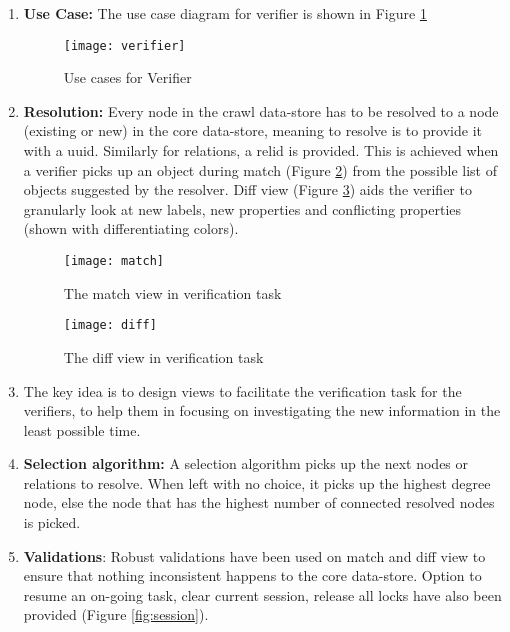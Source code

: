 \begin{enumerate}

\item \textbf{Use Case:} The use case diagram for verifier is shown in Figure \ref{fig:verifier}


\begin{figure}[H]
\begin{center}  
\texttt{[image: verifier]} 
\caption{Use cases for Verifier}
\label{fig:verifier}
\end{center}
\end{figure}
 
\item \textbf{Resolution:} Every node in the crawl data-store has to be resolved to a node (existing or new) in the core data-store, meaning to resolve is to provide it with a uuid. Similarly for relations, a relid is provided. This is achieved when a verifier picks up an object during match (Figure \ref{fig:match}) from the possible list of objects suggested by the resolver. Diff view (Figure \ref{fig:diff}) aids the verifier to granularly look at new labels, new properties and conflicting properties (shown with differentiating colors).

\begin{figure}[H]
\begin{center}  
\texttt{[image: match]} 
\caption{The match view in verification task}
\label{fig:match}
\end{center}
\end{figure}

\begin{figure}[H]
\begin{center}  
\texttt{[image: diff]} 
\caption{The diff view in verification task}
\label{fig:diff}
\end{center}
\end{figure}

\item The key idea is to design views to facilitate the verification task for the verifiers, to help them in focusing on investigating the new information in the least possible time. 

\item \textbf{Selection algorithm:} A selection algorithm picks up the next nodes or relations to resolve. When left with no choice, it picks up the highest degree node, else the node that has the highest number of connected resolved nodes is picked.

\item \textbf{Validations}: Robust validations have been used on match and diff view to ensure that nothing inconsistent happens to the core data-store. Option to resume an on-going task, clear current session, release all locks have also been provided (Figure \ref{fig:session}).


\end{enumerate}
